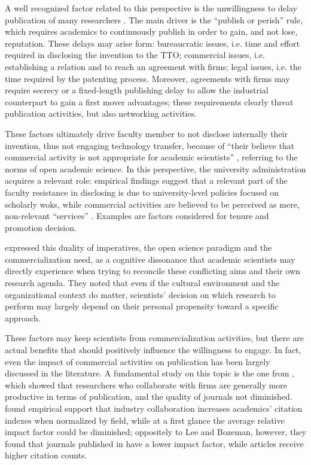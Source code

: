 A well recognized factor related to this perspective is the unwillingness to delay publication of many researchers \citep{Thursby2002, OShea2004, Baldini2007}. The main driver is the \enquote{publish or perish} rule, which requires academics to continuously publish in order to gain, and not lose, reputation. These delays may arise form: bureaucratic issues, i.e. time and effort required in disclosing the invention to the TTO; commercial issues, i.e. establishing a relation and to reach an agreement with firms; legal issues, i.e. the time required by the patenting process. Moreover, agreements with firms may require secrecy or a fixed-length publishing delay to allow the industrial counterpart to gain a first mover advantages; these requirements clearly threat publication activities, but also networking activities. 

These factors ultimately drive faculty member to not disclose internally their invention, thus not engaging technology transfer, because of \enquote{their believe that commercial activity is not appropriate for academic scientists} \citep{Bercovitz2006}, referring to the norms of open academic science.  In this perspective, the university administration acquires a relevant role: empirical findings suggest that a relevant part of the faculty resistance in disclosing is due to university-level policies focused on scholarly woks, while commercial activities are believed to be perceived as mere, non-relevant \enquote{services} \citep{Markman2005}. Examples are factors considered for tenure and promotion decision.

\citet{Muscio2013} expressed this duality of imperatives, the open science paradigm and the commercialization need, as a cognitive dissonance that academic scientists may directly experience when trying to reconcile these conflicting aims and their own research agenda. They noted that even if the cultural environment and the organizational context do matter, scientists' decision on which research to perform may largely depend on their personal propensity toward a specific approach.

These factors may keep scientists from commercialization activities, but there are actual benefits that should positively influence the willingness to engage. In fact, even the impact of commercial activities on publication has been largely discussed in the literature. A fundamental study on this topic is the one from \citet{Lee2005}, which showed that researchers who collaborate with firms are generally more productive in terms of publication, and the quality of journals not diminished. \citet{Lebeau2008} found empirical support that industry collaboration increases academics' citation indexes when normalized by field, while at a first glance the average relative impact factor could be diminished; oppositely to Lee and Bozeman, however, they found that journals published in have a lower impact factor, while articles receive higher citation counts.

